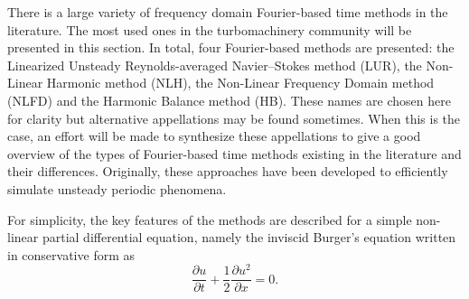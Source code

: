 
There is a large variety of frequency domain Fourier-based time methods in the
literature. 
The most used ones in the turbomachinery community will be presented in this section.
In total, four Fourier-based methods are presented: 
the Linearized Unsteady Reynolds-averaged Navier--Stokes method (LUR), 
the Non-Linear Harmonic method (NLH), 
the Non-Linear Frequency Domain method (NLFD) 
and the Harmonic Balance method (HB).
These names are chosen here
for clarity but alternative appellations may be found sometimes. 
When this is the case, an effort will be made to synthesize
these appellations to give a good 
overview of the types of Fourier-based time methods existing in the literature
and their differences. Originally, these approaches have been developed
to efficiently simulate unsteady periodic phenomena.

For simplicity, the key features of the methods are described for
a simple non-linear partial differential equation, namely
the inviscid Burger's equation written in conservative form as
\begin{equation}
  \frac{\partial u}{\partial t} + 
  \frac{1}{2} \frac{\partial u^2}{\partial x} = 
  0.
  \label{eq:sm_nonlinear_convection_conservative}
\end{equation}
